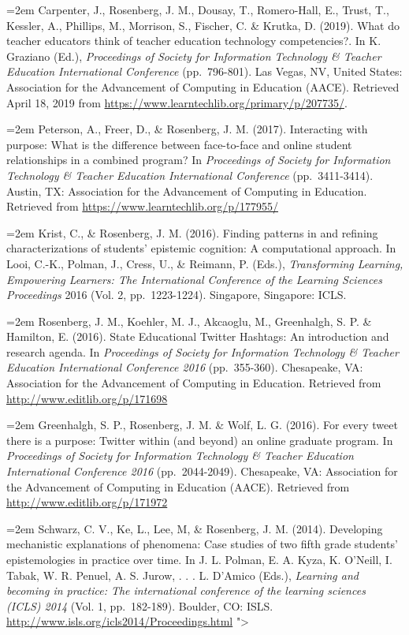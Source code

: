 \documentclass[
  14,
]{article}
\begin{document}
\hangindent=2em Carpenter, J., Rosenberg, J. M., Dousay, T.,
Romero-Hall, E., Trust, T., Kessler, A., Phillips, M., Morrison, S.,
Fischer, C. \& Krutka, D. (2019). What do teacher educators think of
teacher education technology competencies?. In K. Graziano (Ed.),
\emph{Proceedings of Society for Information Technology \& Teacher
Education International Conference} (pp.~796-801). Las Vegas, NV, United
States: Association for the Advancement of Computing in Education
(AACE). Retrieved April 18, 2019 from
\url{https://www.learntechlib.org/primary/p/207735/}.

\hangindent=2em Peterson, A., Freer, D., \& Rosenberg, J. M. (2017).
Interacting with purpose: What is the difference between face-to-face
and online student relationships in a combined program? In
\emph{Proceedings of Society for Information Technology \& Teacher
Education International Conference} (pp.~3411-3414). Austin, TX:
Association for the Advancement of Computing in Education. Retrieved
from \url{https://www.learntechlib.org/p/177955/}

\hangindent=2em Krist, C., \& Rosenberg, J. M. (2016). Finding patterns
in and refining characterizations of students' epistemic cognition: A
computational approach. In Looi, C.-K., Polman, J., Cress, U., \&
Reimann, P. (Eds.), \emph{Transforming Learning, Empowering Learners:
The International Conference of the Learning Sciences Proceedings} 2016
(Vol. 2, pp.~1223-1224). Singapore, Singapore: ICLS.

\hangindent=2em Rosenberg, J. M., Koehler, M. J., Akcaoglu, M.,
Greenhalgh, S. P. \& Hamilton, E. (2016). State Educational Twitter
Hashtags: An introduction and research agenda. In \emph{Proceedings of
Society for Information Technology \& Teacher Education International
Conference 2016} (pp.~355-360). Chesapeake, VA: Association for the
Advancement of Computing in Education. Retrieved from
\url{http://www.editlib.org/p/171698}

\hangindent=2em Greenhalgh, S. P., Rosenberg, J. M. \& Wolf, L. G.
(2016). For every tweet there is a purpose: Twitter within (and beyond)
an online graduate program. In \emph{Proceedings of Society for
Information Technology \& Teacher Education International Conference
2016} (pp.~2044-2049). Chesapeake, VA: Association for the Advancement
of Computing in Education (AACE). Retrieved from
\url{http://www.editlib.org/p/171972}

\hangindent=2em Schwarz, C. V., Ke, L., Lee, M, \& Rosenberg, J. M.
(2014). Developing mechanistic explanations of phenomena: Case studies
of two fifth grade students' epistemologies in practice over time. In J.
L. Polman, E. A. Kyza, K. O'Neill, I. Tabak, W. R. Penuel, A. S. Jurow,
. . . L. D'Amico (Eds.), \emph{Learning and becoming in practice: The
international conference of the learning sciences (ICLS) 2014} (Vol. 1,
pp.~182-189). Boulder, CO: ISLS.
\url{http://www.isls.org/icls2014/Proceedings.html} "\textgreater{}
\end{document}

